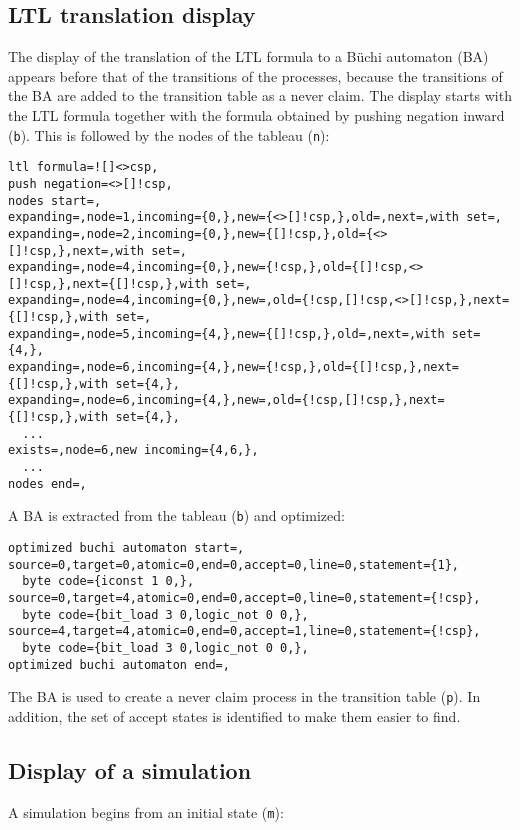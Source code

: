 \documentclass[11pt]{article}
\newcommand*{\p}[1]{\texttt{#1}}
\begin{document}
\subsection{LTL translation display}
The display of the translation of the LTL formula to a B\"{u}chi
automaton (BA) appears before that of the transitions of the processes,
because the transitions of the BA are added to the transition table as a
never claim. The display starts with the LTL formula together with the
formula obtained by pushing negation inward (\p{b}). This is followed by
the nodes of the tableau (\p{n}):

\begin{footnotesize}
\begin{verbatim}
ltl formula=![]<>csp,
push negation=<>[]!csp,
nodes start=,
expanding=,node=1,incoming={0,},new={<>[]!csp,},old=,next=,with set=,
expanding=,node=2,incoming={0,},new={[]!csp,},old={<>[]!csp,},next=,with set=,
expanding=,node=4,incoming={0,},new={!csp,},old={[]!csp,<>[]!csp,},next={[]!csp,},with set=,
expanding=,node=4,incoming={0,},new=,old={!csp,[]!csp,<>[]!csp,},next={[]!csp,},with set=,
expanding=,node=5,incoming={4,},new={[]!csp,},old=,next=,with set={4,},
expanding=,node=6,incoming={4,},new={!csp,},old={[]!csp,},next={[]!csp,},with set={4,},
expanding=,node=6,incoming={4,},new=,old={!csp,[]!csp,},next={[]!csp,},with set={4,},
  ...
exists=,node=6,new incoming={4,6,},
  ...
nodes end=,
\end{verbatim}
\end{footnotesize}

A BA is extracted from the tableau (\p{b}) and optimized:

\begin{footnotesize}
\begin{verbatim}
optimized buchi automaton start=,
source=0,target=0,atomic=0,end=0,accept=0,line=0,statement={1},
  byte code={iconst 1 0,},
source=0,target=4,atomic=0,end=0,accept=0,line=0,statement={!csp},
  byte code={bit_load 3 0,logic_not 0 0,},
source=4,target=4,atomic=0,end=0,accept=1,line=0,statement={!csp},
  byte code={bit_load 3 0,logic_not 0 0,},
optimized buchi automaton end=,
\end{verbatim}
\end{footnotesize}

The BA is used to create a never claim process in the transition table
(\p{p}). In addition, the set of accept states is identified to make
them easier to find.

\subsection{Display of a simulation}
A simulation begins from an initial state (\p{m}):
\end{document}
